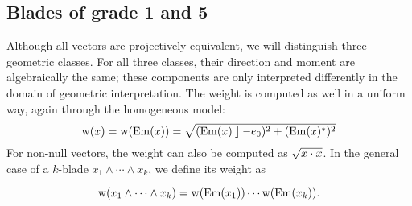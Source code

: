 \subsection{Blades of grade 1 and 5}
Although all vectors are projectively equivalent, we will distinguish three geometric classes.  For all three classes, their direction and moment are algebraically the same; these components are only interpreted differently in the domain of geometric interpretation.  The weight is computed as well in a uniform way, again through the homogeneous model:
\begin{equation*}
  \operatorname{w}(x) = 
      \operatorname{w}(\operatorname{Em}(x)) = \sqrt{(\operatorname{Em}(x) \mathbin{\rfloor} -e_0)^2 + (\operatorname{Em}(x)^\ast)^2} 
\end{equation*}
For non-null vectors, the weight can also be computed as $\sqrt{x \mathbin{\cdot} x}$.  In the general case of a $k$-blade $x_1 \wedge \cdots \wedge x_k$, we define its weight as 

\begin{equation*}
  \operatorname{w}(x_1 \wedge \cdots \wedge x_k) = \operatorname{w}(\operatorname{Em}(x_1)) \cdots \operatorname{w}(\operatorname{Em}(x_k)) .
\end{equation*}

